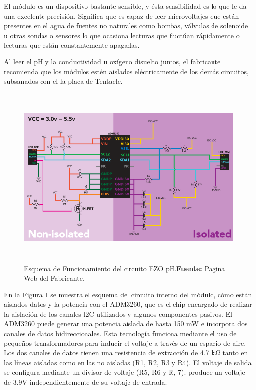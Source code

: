 El módulo es un dispositivo bastante sensible, y ésta sensibilidad es lo que le da una excelente precisión. Significa que es capaz de leer microvoltajes que están presentes en el agua de fuentes no naturales como bombas, válvulas de solenoide u otras sondas o sensores lo que ocasiona lecturas que fluctúan rápidamente o lecturas que están constantemente apagadas.

Al leer el pH y la conductividad u oxígeno disuelto juntos, el fabricante recomienda que los módulos estén aislados eléctricamente de los demás circuitos, subsanados con el la placa de Tentacle.
\newline
\hfill
\begin{figure}[ht]
    \centering
    \includegraphics[width=150mm, height=90mm]{Imagenes/2021/imag36.png}
    \caption[Esquema de Funcionamiento del circuito EZO pH]{Esquema de Funcionamiento del circuito EZO pH.\textbf{Fuente: }Pagina Web del Fabricante\cite{ezoph}.}
    \label{fig:4.10}
\end{figure}
En la Figura \ref{fig:4.10} se muestra  el esquema del circuito interno del módulo, cómo están aislados datos y la potencia con el ADM3260, que es el chip encargado de realizar la aislación de los canales I2C utilizados y algunos componentes pasivos. El ADM3260 puede generar una potencia aislada de hasta 150 mW e incorpora dos canales de datos bidireccionales.
Esta tecnología funciona mediante el uso de pequeños transformadores para inducir el voltaje a través de un espacio de aire. Los dos canales de datos tienen una resistencia de extracción de 4.7 k$\Omega$ tanto en las líneas aisladas como en las no aisladas (R1, R2, R3 y R4). El voltaje de salida se configura mediante un divisor de voltaje (R5, R6 y R, 7). produce un voltaje de 3.9V independientemente de su voltaje de entrada.

